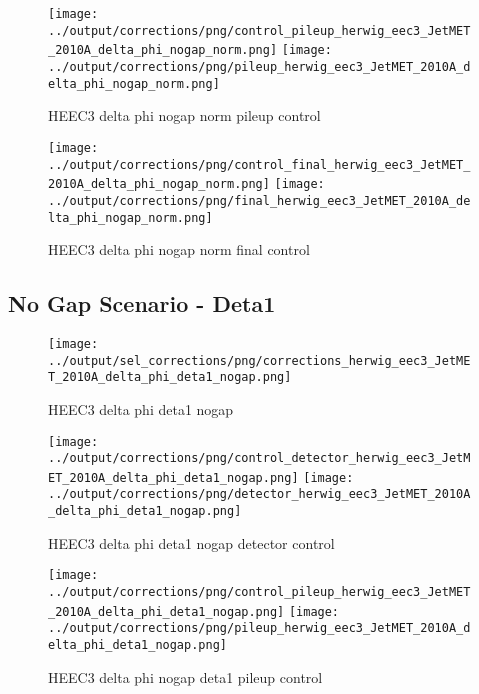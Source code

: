 \documentclass[11pt]{book}
\begin{document}
\begin{figure}[ht]
\centering
\texttt{[image: ../output/corrections/png/control\_pileup\_herwig\_eec3\_JetMET\_2010A\_delta\_phi\_nogap\_norm.png]}
\texttt{[image: ../output/corrections/png/pileup\_herwig\_eec3\_JetMET\_2010A\_delta\_phi\_nogap\_norm.png]}
\caption{HEEC3 delta phi nogap norm pileup control}
\label{fig:HEEC3_JetMET_2010A_delta_phi_nogap_norm_pileup_control}
\end{figure}


\begin{figure}[ht]
\centering
\texttt{[image: ../output/corrections/png/control\_final\_herwig\_eec3\_JetMET\_2010A\_delta\_phi\_nogap\_norm.png]}
\texttt{[image: ../output/corrections/png/final\_herwig\_eec3\_JetMET\_2010A\_delta\_phi\_nogap\_norm.png]}
\caption{HEEC3 delta phi nogap norm final control}
\label{fig:HEEC3_JetMET_2010A_delta_phi_nogap_norm_final_control}
\end{figure}




\clearpage
\subsection{No Gap Scenario - Deta1}
\begin{figure}[ht]
\centering
\texttt{[image: ../output/sel\_corrections/png/corrections\_herwig\_eec3\_JetMET\_2010A\_delta\_phi\_deta1\_nogap.png]}
\caption{HEEC3 delta phi deta1 nogap}
\label{fig:HEEC3_JetMET_2010A_delta_phi_deta1_nogap}
\end{figure}

\begin{figure}[ht]
\centering
\texttt{[image: ../output/corrections/png/control\_detector\_herwig\_eec3\_JetMET\_2010A\_delta\_phi\_deta1\_nogap.png]}
\texttt{[image: ../output/corrections/png/detector\_herwig\_eec3\_JetMET\_2010A\_delta\_phi\_deta1\_nogap.png]}
\caption{HEEC3 delta phi deta1 nogap detector control}
\label{fig:HEEC3_JetMET_2010A_delta_phi_deta1_nogap_detector_control}
\end{figure}

\begin{figure}[ht]
\centering
\texttt{[image: ../output/corrections/png/control\_pileup\_herwig\_eec3\_JetMET\_2010A\_delta\_phi\_deta1\_nogap.png]}
\texttt{[image: ../output/corrections/png/pileup\_herwig\_eec3\_JetMET\_2010A\_delta\_phi\_deta1\_nogap.png]}
\caption{HEEC3 delta phi nogap deta1 pileup control}
\label{fig:HEEC3_JetMET_2010A_delta_phi_deta1_nogap_pileup_control}
\end{figure}
\end{document}
